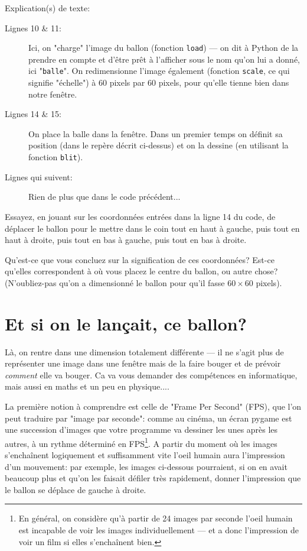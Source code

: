\documentclass[11pt]{article}
\begin{document}
	Explication(s) de texte:
	\begin{description}
		\item[Lignes 10 \& 11:] Ici, on "charge" l'image du ballon (fonction \texttt{load}) --- on dit à Python de la prendre en compte et d'être prêt à l'afficher sous le nom qu'on lui a donné, ici "\texttt{balle}". On redimensionne l'image également (fonction \texttt{scale}, ce qui signifie "échelle") à 60 pixels par 60 pixels, pour qu'elle tienne bien dans notre fenêtre.
		\item[Lignes 14 \& 15:] On place la balle dans la fenêtre. Dans un premier temps on définit sa position (dans le repère décrit ci-dessus) et on la dessine (en utilisant la fonction \texttt{blit}).
		\item[Lignes qui suivent:] Rien de plus que dans le code précédent...
	\end{description}
	
	\begin{MonAct}
		Essayez, en jouant sur les coordonnées entrées dans la ligne 14 du code, de déplacer le ballon pour le mettre dans le coin tout en haut à gauche, puis tout en haut à droite, puis tout en bas à gauche, puis tout en bas à droite.
		
		Qu'est-ce que vous concluez sur la signification de ces coordonnées? Est-ce qu'elles correspondent à où vous placez le centre du ballon, ou autre chose? (N'oubliez-pas qu'on a dimensionné le ballon pour qu'il fasse $60 \times 60$ pixels).
	\end{MonAct}
	
	\section{Et si on le lançait, ce ballon?}
	Là, on rentre dans une dimension totalement différente --- il ne s'agit plus de représenter une image dans une fenêtre mais de la faire bouger et de prévoir \textit{comment} elle va bouger. Ca va vous demander des compétences en informatique, mais aussi en maths et un peu en physique....
	
	La première notion à comprendre est celle de "Frame Per Second" (FPS), que l'on peut traduire par "image par seconde": comme au cinéma, un écran pygame est une succession d'images que votre programme va dessiner les unes après les autres, à un rythme déterminé en FPS\footnote{En général, on considère qu'à partir de 24 images par seconde l'oeil humain est incapable de voir les images individuellement --- et a donc l'impression de voir un film si elles s'enchaînent bien.}. A partir du moment où les images s'enchaînent logiquement et suffisamment vite l'oeil humain aura l'impression d'un mouvement: par exemple, les images ci-dessous pourraient, si on en avait beaucoup plus et qu'on les faisait défiler très rapidement, donner l'impression que le ballon se déplace de gauche à droite.
	
\end{document}
